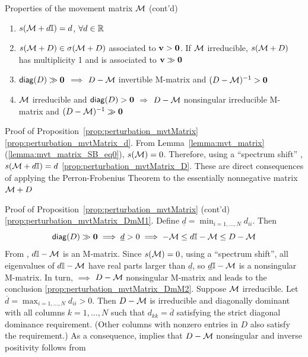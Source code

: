 \documentclass[aspectratio=169]{beamer}
\begin{document}
\begin{frame}{Properties of the movement matrix $\mathcal{M}$ (cont'd)}
	\begin{proposition}\label{prop:perturbation_mvtMatrix}
		\begin{enumerate}
			\item $s(\mathcal{M}+d\mathbb{I})=d$, $\forall d\in\mathbb{R}$ \label{prop:perturbation_mvtMatrix_d}
			\item $s(\mathcal{M}+D)\in\sigma(\mathcal{M}+D)$ associated to $\bv>\b0$. If $\mathcal{M}$ irreducible, $s(\mathcal{M}+D)$ has  multiplicity 1 and is associated to $\bv\gg \b0$ \label{prop:perturbation_mvtMatrix_D}
			\item $\diag (D)\gg \b0$ $\implies$ $D-\mathcal{M}$ invertible M-matrix and $(D-\M)^{-1}> \b0$ \label{prop:perturbation_mvtMatrix_DmM1}
			\item $\mathcal{M}$ irreducible and $\diag(D)>\b0$ $\Longrightarrow$ $D-\mathcal{M}$ nonsingular irreducible M-matrix and $(D-\M)^{-1}\gg \b0$ \label{prop:perturbation_mvtMatrix_DmM2}
		\end{enumerate}
	\end{proposition}
\end{frame}


\begin{frame}{Proof of Proposition~\ref{prop:perturbation_mvtMatrix}}
\ref{prop:perturbation_mvtMatrix_d}. From Lemma~\ref{lemma:mvt_matrix}(\ref{lemma:mvt_matrix_SB_eq0}), $s(\mathcal{M})=0$. Therefore, using a ``spectrum shift'' \cite[Problem 1.2.P8]{HornJohnson2013}, $s(\mathcal{M}+d\mathbb{I})=d$
\vfill
\noindent\ref{prop:perturbation_mvtMatrix_D}. These are direct consequences of applying the Perron-Frobenius Theorem to the essentially nonnegative matrix $\mathcal{M}+D$
\vfill
\end{frame}


\begin{frame}{Proof of Proposition~\ref{prop:perturbation_mvtMatrix} (cont'd)}
\noindent\ref{prop:perturbation_mvtMatrix_DmM1}.
Define $\underline{d}=\min_{i=1,\ldots,N}d_{ii}$. Then
\[
\diag (D)\gg \b0 \implies \underline{d}>0 \implies -\M\leq d\II-\M\leq D-\M
\]
From \cite[Theorem 5.2.5]{Fiedler2008}, $d\mathbb{I}-\mathcal{M}$ is an M-matrix. 
Since $s(\mathcal{M})=0$, using a ``spectrum shift'', all eigenvalues of $d\mathbb{I}-\mathcal{M}$ have real parts larger
than $\underline{d}$, so $\underline{d}\mathbb{I}-\mathcal{M}$ is a nonsingular M-matrix. 
In turn, \cite[Theorem 5.1.1(4)]{Fiedler2008} $\implies$ $D-\mathcal{M}$ nonsingular M-matrix and \cite[Theorem 5.1.1(11)]{Fiedler2008} leads to the conclusion
\vfill
\noindent\ref{prop:perturbation_mvtMatrix_DmM2}. 
Suppose $\mathcal{M}$ irreducible. 
Let $\overline{d}=\max_{i=1,\ldots,N}d_{ii}>0$.
Then $D-\mathcal{M}$ is  irreducible and diagonally dominant with all columns $k=1,\ldots,N$ such that $d_{kk}=\overline{d}$ satisfying the strict diagonal
dominance requirement. (Other columns with nonzero entries in $D$ also satisfy the requirement.)
As a consequence, \cite[Theorem 1.11]{Varga2010} implies that $D-\mathcal{M}$ nonsingular and inverse positivity follows from \cite[Theorem 5.2.10]{Fiedler2008}
\end{frame}
\end{document}
